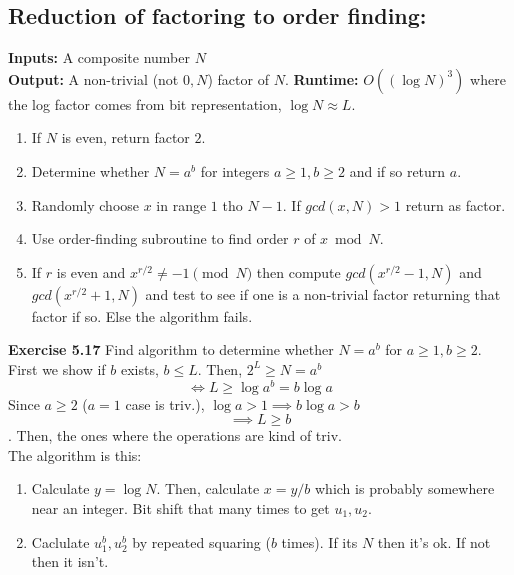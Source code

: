 \documentclass{article}
\begin{document}
\subsection{Reduction of factoring to order finding:}
\textbf{Inputs:} A composite number $N$\\
\textbf{Output:} A non-trivial (not $0, N$) factor of $N$.
\textbf{Runtime:} $O((\log N)^3)$ where the log factor comes from bit representation, $\log N \approx L$.
\begin{enumerate}
	\item If $N$ is even, return factor $2$.
	\item Determine whether $N = a^b$ for integers $a \geq 1, b\geq2$ and if so return $a$.
	\item Randomly choose $x$ in range $1$ tho $N-1$. If $gcd(x,N) > 1$ return as factor. 
	\item Use order-finding subroutine to find order $r$ of $x \bmod N$.
\item If $r$ is even and $x^{r/2} \neq -1 \pmod{N}$ then compute $gcd(x^{r/2} -1,N)$ and $gcd(x^{r/2}+1, N)$ and test to see if one is a non-trivial factor returning that factor if so. Else the algorithm fails.
\end{enumerate}
\begin{tcolorbox} \textbf{Exercise 5.17} Find algorithm to determine whether $N=a^b$ for $a \geq 1, b\geq2$. \\
	First we show if $b$ exists, $b\leq L$. Then, $ 2^L \geq N = a^b$
	$$\iff L \geq \log a^b=  b \log a$$
	Since $a \geq 2$ ($a=1$ case is triv.), $\log a > 1 \implies b \log a > b$
	$$\implies L \geq b$$.
	Then, the ones where the operations are kind of triv.\\
	The algorithm is this:
	\begin{enumerate}
		\item Calculate $y = \log N$. Then, calculate $x = y/b$ which is probably somewhere near an integer. Bit shift that many times to get $u_1, u_2$.
		\item Caclulate $u^b_1, u^b_2$ by repeated squaring ($b$ times). If its $N$ then it's ok. If not then it isn't.
	\end{enumerate}
\end{tcolorbox}
\end{document}
